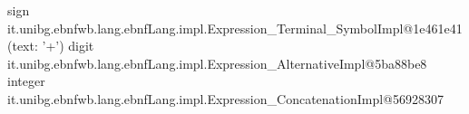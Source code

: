 \documentclass{article}
\begin{document}
\begin{grammar}

    sign
    it.unibg.ebnfwb.lang.ebnfLang.impl.Expression_Terminal_SymbolImpl@1e461e41 (text: '+')
    digit
    it.unibg.ebnfwb.lang.ebnfLang.impl.Expression_AlternativeImpl@5ba88be8
    integer
    it.unibg.ebnfwb.lang.ebnfLang.impl.Expression_ConcatenationImpl@56928307
    
\end{grammar}
\end{document}
